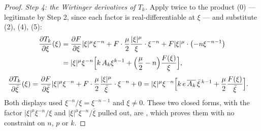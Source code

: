\begin{proof}
\emph{Step 4: the Wirtinger derivatives of $T_k$.}  Apply
 twice to the product (0) --- legitimate by
Step 2, since each factor is real-differentiable at $\xi$ --- and substitute
(2), (4), (5):
\begin{align*}
  \frac{\partial T_k}{\partial\xi}(\xi)
  &=\frac{\partial F}{\partial\xi}|\xi|^{\mu}\xi^{-n}
    +F\cdot\frac{\mu}{2}\frac{|\xi|^{\mu}}{\xi}\cdot\xi^{-n}
    +F|\xi|^{\mu}\cdot\bigl(-n\xi^{-n-1}\bigr)\\
  &=|\xi|^{\mu}\xi^{-n}\Bigl[k\,A_k\xi^{k-1}
      +\Bigl(\frac{\mu}{2}-n\Bigr)\frac{F(\xi)}{\xi}\Bigr],
\end{align*}
\begin{align*}
  \frac{\partial T_k}{\partial\bar\xi}(\xi)
  &=\frac{\partial F}{\partial\bar\xi}|\xi|^{\mu}\xi^{-n}
    +F\cdot\frac{\mu}{2}\frac{|\xi|^{\mu}}{\bar\xi}\cdot\xi^{-n}+0
  =|\xi|^{\mu}\xi^{-n}\Bigl[k\,e\,\overline{A_k}\,\bar\xi^{\,k-1}
      +\frac{\mu}{2}\frac{F(\xi)}{\bar\xi}\Bigr].
\end{align*}
Both displays used $\xi^{-n}/\xi=\xi^{-n-1}$ and $\xi\neq0$.
These two closed forms, with the factor $|\xi|^{\mu}\xi^{-n}/\xi$ and
$|\xi|^{\mu}\xi^{-n}/\bar\xi$ pulled out, are
, which proves them with no constraint on
$n$, $p$ or $k$.


\end{proof}
